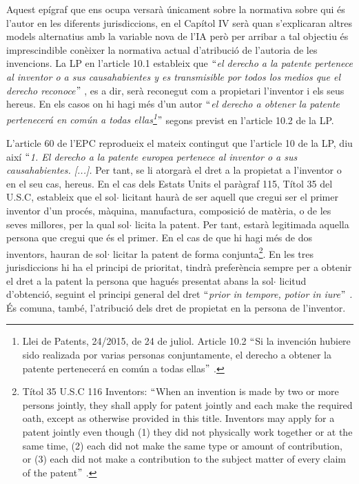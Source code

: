 \documentclass[12pt]{article}
\renewcommand{\_}{\kern-1.5pt\textunderscore\kern-1.5pt}
\begin{document}
\begin{itemize}
\vspace{\baselineskip}
\begin{justify}
Aquest epígraf que ens ocupa versarà únicament sobre la normativa sobre qui és l’autor en les diferents jurisdiccions, en el Capítol IV serà quan s’explicaran altres models alternatius amb la variable nova de l’IA però per arribar a tal objectiu és imprescindible conèixer la normativa actual d’atribució de l’autoria de les invencions.  La LP en l’article 10.1 estableix que \textit{$``$el derecho a la patente pertenece al inventor o a sus causahabientes y es transmisible por todos los medios que el derecho reconoce$"$ }, es a dir, serà reconegut com a propietari l’inventor i els seus hereus. En els casos on hi hagi més d’un autor $``$\textit{el derecho a obtener la patente pertenecerá en común a todas ellas\footnote{ Llei de Patents, 24/2015, de 24 de juliol. Article 10.2 $``$Si la invención hubiere sido realizada por varias personas conjuntamente, el derecho a obtener la patente pertenecerá en común a todas ellas$"$ . }$"$ } segons previst en l’article 10.2 de la LP. 
\end{justify}\par


\vspace{\baselineskip}
\begin{justify}
L’article 60 de l’EPC reprodueix el mateix contingut que l’article 10 de la LP, diu així $``$\textit{1. El derecho a la patente europea pertenece al inventor o a sus causahabientes. [...]. }Per tant, se li atorgarà el dret a la propietat a l’inventor o en el seu cas, hereus. En el cas dels Estats Units el paràgraf 115, Títol 35 del U.S.C, estableix que el sol$ \cdot $ licitant haurà de ser aquell que cregui ser el primer inventor d’un procés, màquina, manufactura, composició de matèria, o de les seves millores, per la qual sol$ \cdot $ licita la patent. Per tant, estarà legitimada aquella persona que cregui que és el primer. En el cas de que hi hagi més de dos inventors, hauran de sol$ \cdot $ licitar la patent de forma conjunta\footnote{ Títol 35 U.S.C 116 Inventors: $``$When an invention is made by two or more persons jointly, they shall apply for patent jointly and each make the required oath, except as otherwise provided in this title. Inventors may apply for a patent jointly even though (1) they did not physically work together or at the same time, (2) each did not make the same type or amount of contribution, or (3) each did not make a contribution to the subject matter of every claim of the patent$"$ . }.  En les tres jurisdiccions hi ha el principi de prioritat, tindrà preferència sempre per a obtenir el dret a la patent la persona que hagués presentat abans la sol$ \cdot $ licitud d’obtenció, seguint el principi general del dret $``$\textit{prior in tempore, potior in iure$"$ . }És comuna, també, l’atribució dels dret de propietat en la persona de l’inventor.
\end{justify}\par



\end{itemize}
\end{document}
